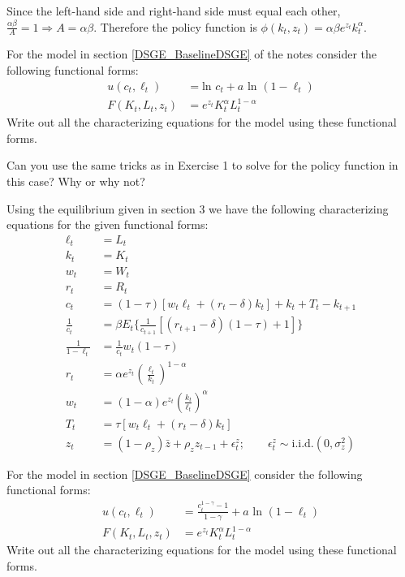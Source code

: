 \documentclass[letterpaper,11pt]{article}
\theoremstyle{definition}
\begin{document}
\begin{spacing}{1.5}
	Since the left-hand side and right-hand side must equal each other, $\frac{\alpha\beta}{A} = 1 \Longrightarrow A = \alpha\beta$. Therefore the policy function is $\phi(k_t,z_t) = \alpha\beta e^{z_t}k_t^\alpha$.

	\begin{Exercise} \label{DSGE_HW_CharEq_Ln}
		For the model in section \ref{DSGE_BaselineDSGE} of the notes consider the following functional forms:
		\begin{equation}\label{DSGE_HW_CharEq_Ln_eq01}
		\begin{split}
		u(c_t,\ell_t) & = \text{ln }c_t + a \text{ ln }(1-\ell_t)\\
		F(K_t,L_t,z_t) & = e^{z_t}K^{\alpha}_t L^{1-\alpha}_t  \nonumber
		\end{split}
		\end{equation}
		Write out all the characterizing equations for the model using these functional forms.

		Can you use the same tricks as in Exercise 1 to solve for the policy function in this case?  Why or why not?
	\end{Exercise}

	Using the equilibrium given in section 3 we have the following characterizing equations for the given functional forms:
	\begin{align*}
		\ell_t &= L_t \\
		k_t &= K_t \\
		w_t &= W_t \\
		r_t &= R_t \\
		c_t &= (1-\tau)[w_t\ell_t+(r_t-\delta)k_t]+k_t+T_t-k_{t+1} \\
		\frac{1}{c_t} &=  \beta E_t\{\frac{1}{c_{t+1}}[(r_{t+1}-\delta)(1-\tau)+1]\} \\
		\frac{1}{1-\ell_t} &= \frac{1}{c_t}w_t(1-\tau) \\
		r_t&= \alpha e^{z_t}(\frac{\ell_t}{k_t})^{1-\alpha}\\
		w_t&= (1-\alpha) e^{z_t}(\frac{k_t}{\ell_t})^{\alpha}\\
		T_t &= \tau[w_t\ell_t+(r_t-\delta)k_t] \\
		z_t &= (1-\rho_z)\bar{z}+\rho_zz_{t-1}+\epsilon_t^z; \qquad \epsilon_t^z \sim \text{i.i.d.}(0,\sigma_z^2)
	\end{align*}

	\begin{Exercise} \label{DSGE_HW_CharEq_CES_Ln}
		For the model in section \ref{DSGE_BaselineDSGE} consider the following functional forms:
		\begin{equation}\label{DSGE_HW_CharEq_CES_Ln_eq01}
		\begin{split}
		u(c_t,\ell_t) & = \frac{c^{1-\gamma}_t -1}{1-\gamma}+ a \text{ ln }(1-\ell_t)\\
		F(K_t,L_t,z_t) & = e^{z_t}K^{\alpha}_t L^{1-\alpha}_t  \nonumber
		\end{split}
		\end{equation}
		Write out all the characterizing equations for the model using these functional forms.
	\end{Exercise}


\end{spacing}
\end{document}
